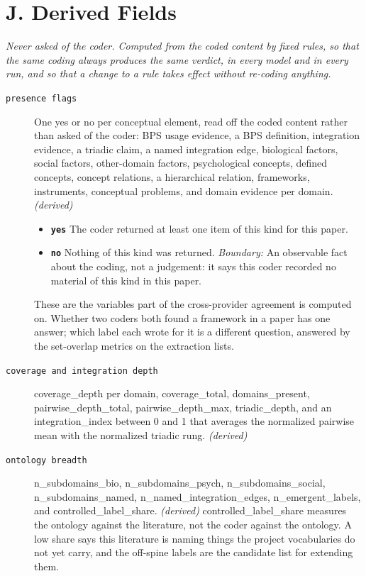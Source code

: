 \documentclass[11pt]{article}
\begin{document}
\section*{J. Derived Fields}
{\small\itshape Never asked of the coder. Computed from the coded content by fixed rules, so that the same coding always produces the same verdict, in every model and in every run, and so that a change to a rule takes effect without re-coding anything.}\par\smallskip
\begin{description}
\item[\texttt{presence flags}] One yes or no per conceptual element, read off the coded content rather than asked of the coder: BPS usage evidence, a BPS definition, integration evidence, a triadic claim, a named integration edge, biological factors, social factors, other-domain factors, psychological concepts, defined concepts, concept relations, a hierarchical relation, frameworks, instruments, conceptual problems, and domain evidence per domain. \textit{(derived)}
  \begin{itemize}[leftmargin=1.3em,itemsep=2pt,topsep=2pt]
  \item \textbf{\texttt{yes}} The coder returned at least one item of this kind for this paper.
  \item \textbf{\texttt{no}} Nothing of this kind was returned. {\small \textit{Boundary:} An observable fact about the coding, not a judgement: it says this coder recorded no material of this kind in this paper.}
  \end{itemize}
{\small These are the variables part of the cross-provider agreement is computed on. Whether two coders both found a framework in a paper has one answer; which label each wrote for it is a different question, answered by the set-overlap metrics on the extraction lists.}
\item[\texttt{coverage and integration depth}] coverage\_depth per domain, coverage\_total, domains\_present, pairwise\_depth\_total, pairwise\_depth\_max, triadic\_depth, and an integration\_index between 0 and 1 that averages the normalized pairwise mean with the normalized triadic rung. \textit{(derived)}
\item[\texttt{ontology breadth}] n\_subdomains\_bio, n\_subdomains\_psych, n\_subdomains\_social, n\_subdomains\_named, n\_named\_integration\_edges, n\_emergent\_labels, and controlled\_label\_share. \textit{(derived)}
{\small controlled\_label\_share measures the ontology against the literature, not the coder against the ontology. A low share says this literature is naming things the project vocabularies do not yet carry, and the off-spine labels are the candidate list for extending them.}

\end{description}
\end{document}
